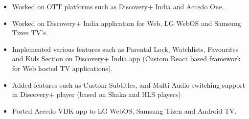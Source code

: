 \documentclass[10pt,a4paper,ragged2e]{maltacv}
\begin{document}


\makecvheader


\begin{itemize}
  \item Worked on OTT platforms such as Discovery+ India and Accedo One.
  \item Worked on Discovery+ India application for Web, LG WebOS and Samsung Tizen TV's.  
  \item Implemented various features such as Parental Lock, Watchlists, Favourites and Kids Section on Discovery+ India app (Custom React based framework for Web hosted TV applications).
  \item Added features such as Custom Subtitles, and Multi-Audio switching support in Discovery+ player (based on Shaka and HLS players)
  \item Ported Accedo VDK app to LG WebOS, Samsung Tizen and Android TV. 
\end{itemize}
\end{document}
